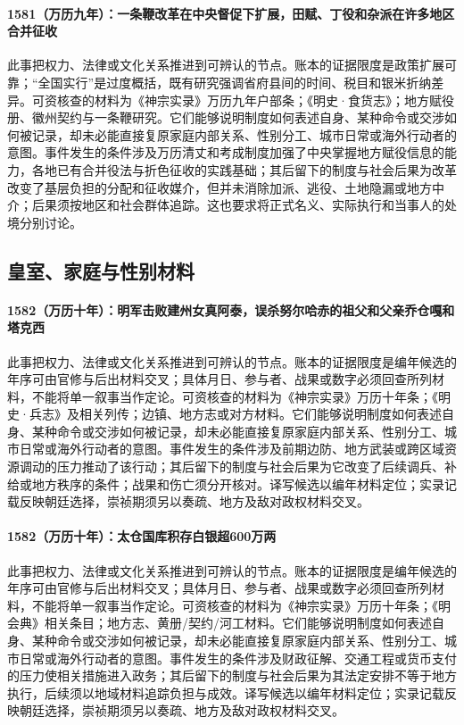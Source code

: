 \paragraph{1581（万历九年）：一条鞭改革在中央督促下扩展，田赋、丁役和杂派在许多地区合并征收} 此事把权力、法律或文化关系推进到可辨认的节点。账本的证据限度是政策扩展可靠；“全国实行”是过度概括，既有研究强调省府县间的时间、税目和银米折纳差异。可资核查的材料为《神宗实录》万历九年户部条；《明史·食货志》；地方赋役册、徽州契约与一条鞭研究。它们能够说明制度如何表述自身、某种命令或交涉如何被记录，却未必能直接复原家庭内部关系、性别分工、城市日常或海外行动者的意图。事件发生的条件涉及万历清丈和考成制度加强了中央掌握地方赋役信息的能力，各地已有合并役法与折色征收的实践基础；其后留下的制度与社会后果为改革改变了基层负担的分配和征收媒介，但并未消除加派、逃役、土地隐漏或地方中介；后果须按地区和社会群体追踪。这也要求将正式名义、实际执行和当事人的处境分别讨论。

\subsection{皇室、家庭与性别材料}

\paragraph{1582（万历十年）：明军击败建州女真阿泰，误杀努尔哈赤的祖父和父亲乔仓嘎和塔克西} 此事把权力、法律或文化关系推进到可辨认的节点。账本的证据限度是编年候选的年序可由官修与后出材料交叉；具体月日、参与者、战果或数字必须回查所列材料，不能将单一叙事当作定论。可资核查的材料为《神宗实录》万历十年条；《明史·兵志》及相关列传；边镇、地方志或对方材料。它们能够说明制度如何表述自身、某种命令或交涉如何被记录，却未必能直接复原家庭内部关系、性别分工、城市日常或海外行动者的意图。事件发生的条件涉及前期边防、地方武装或跨区域资源调动的压力推动了该行动；其后留下的制度与社会后果为它改变了后续调兵、补给或地方秩序的条件；战果和伤亡须分开核对。译写候选以编年材料定位；实录记载反映朝廷选择，崇祯期须另以奏疏、地方及敌对政权材料交叉。

\paragraph{1582（万历十年）：太仓国库积存白银超600万两} 此事把权力、法律或文化关系推进到可辨认的节点。账本的证据限度是编年候选的年序可由官修与后出材料交叉；具体月日、参与者、战果或数字必须回查所列材料，不能将单一叙事当作定论。可资核查的材料为《神宗实录》万历十年条；《明会典》相关条目；地方志、黄册/契约/河工材料。它们能够说明制度如何表述自身、某种命令或交涉如何被记录，却未必能直接复原家庭内部关系、性别分工、城市日常或海外行动者的意图。事件发生的条件涉及财政征解、交通工程或货币支付的压力使相关措施进入政务；其后留下的制度与社会后果为其法定安排不等于地方执行，后续须以地域材料追踪负担与成效。译写候选以编年材料定位；实录记载反映朝廷选择，崇祯期须另以奏疏、地方及敌对政权材料交叉。

